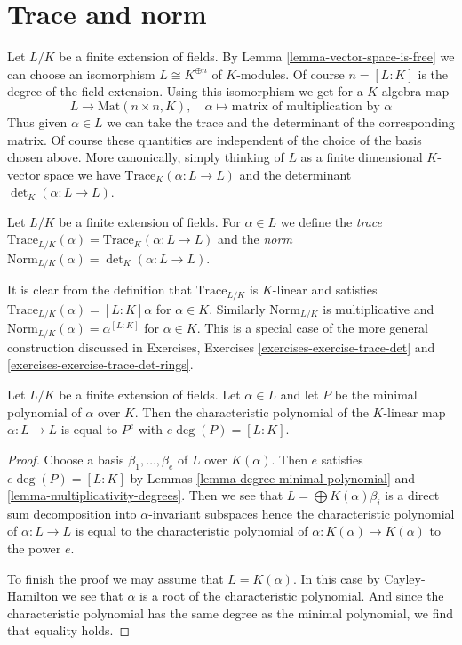 \section{Trace and norm}
\label{section-trace-pairing}

\noindent
Let $L/K$ be a finite extension of fields. By
Lemma \ref{lemma-vector-space-is-free}
we can choose an isomorphism $L \cong K^{\oplus n}$ of $K$-modules.
Of course $n = [L : K]$ is the degree of the field extension.
Using this isomorphism we get for a $K$-algebra map
$$
L \longrightarrow \text{Mat}(n \times n, K),\quad
\alpha \longmapsto \text{matrix of multiplication by }\alpha
$$
Thus given $\alpha \in L$ we can take the trace and the determinant
of the corresponding matrix. Of course these quantities are independent
of the choice of the basis chosen above. More canonically, simply thinking
of $L$ as a finite dimensional $K$-vector space we have
$\text{Trace}_K(\alpha : L \to L)$ and the determinant
$\det_K(\alpha : L \to L)$.

\begin{definition}
\label{definition-trace-norm}
Let $L/K$ be a finite extension of fields. For $\alpha \in L$ we define
the {\it trace}
$\text{Trace}_{L/K}(\alpha) = \text{Trace}_K(\alpha : L \to L)$
and the {\it norm}
$\text{Norm}_{L/K}(\alpha) = \det_K(\alpha : L \to L)$.
\end{definition}

\noindent
It is clear from the definition that
$\text{Trace}_{L/K}$ is $K$-linear and satisfies
$\text{Trace}_{L/K}(\alpha) = [L : K]\alpha$ for $\alpha \in K$.
Similarly $\text{Norm}_{L/K}$ is multiplicative and
$\text{Norm}_{L/K}(\alpha) = \alpha^{[L : K]}$ for $\alpha \in K$.
This is a special case of the more general construction discussed
in Exercises, Exercises \ref{exercises-exercise-trace-det} and
\ref{exercises-exercise-trace-det-rings}.

\begin{lemma}
\label{lemma-characteristic-vs-minimal-polynomial}
Let $L/K$ be a finite extension of fields. Let $\alpha \in L$ and let $P$
be the minimal polynomial of $\alpha$ over $K$. Then the characteristic
polynomial of the $K$-linear map $\alpha : L \to L$ is equal to
$P^e$ with $e \deg(P) = [L : K]$.
\end{lemma}

\begin{proof}
Choose a basis $\beta_1, \ldots, \beta_e$ of $L$ over $K(\alpha)$.
Then $e$ satisfies $e \deg(P) = [L : K]$ by
Lemmas \ref{lemma-degree-minimal-polynomial} and
\ref{lemma-multiplicativity-degrees}.
Then we see that $L = \bigoplus K(\alpha) \beta_i$ is a
direct sum decomposition into $\alpha$-invariant subspaces
hence the characteristic polynomial of $\alpha : L \to L$
is equal to the characteristic polynomial of
$\alpha : K(\alpha) \to K(\alpha)$ to the power $e$.

\medskip\noindent
To finish the proof we may assume that $L = K(\alpha)$.
In this case by Cayley-Hamilton we see that $\alpha$
is a root of the characteristic polynomial. And since the
characteristic polynomial has the same degree as the minimal
polynomial, we find that equality holds.
\end{proof}

